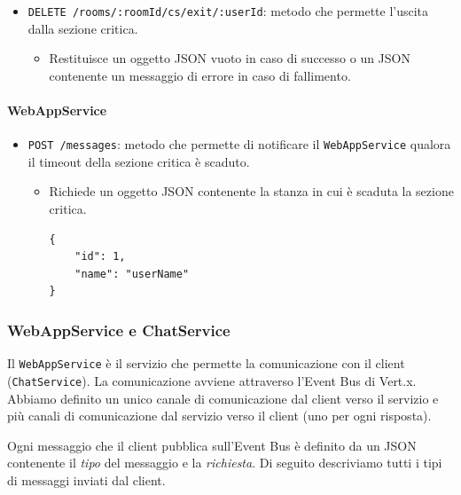 \documentclass[a4paper]{article}
\begin{document}
\begin{itemize}
\begin{itemize}
\begin{verbatim}
    "name": "userName"
}
        \end{verbatim}
        \item Restituisce un oggetto JSON vuoto in caso di successo o un JSON contenente un messaggio di errore in caso di fallimento.
    \end{itemize}
    \item \texttt{DELETE /rooms/:roomId/cs/exit/:userId}: metodo che permette l'uscita dalla sezione critica.
    \begin{itemize}
        \item Restituisce un oggetto JSON vuoto in caso di successo o un JSON contenente un messaggio di errore in caso di fallimento.
    \end{itemize}
\end{itemize}

\paragraph{WebAppService}
\begin{itemize}
    \item \texttt{POST /messages}: metodo che permette di notificare il \texttt{WebAppService} qualora il timeout della sezione critica è scaduto.
    \begin{itemize}
        \item Richiede un oggetto JSON contenente la stanza in cui è scaduta la sezione critica.
        \begin{verbatim}
{
    "id": 1,
    "name": "userName"
}
        \end{verbatim}
    \end{itemize}
\end{itemize}

\subsubsection{WebAppService e ChatService}
Il \texttt{WebAppService} è il servizio che permette la comunicazione con il client (\texttt{ChatService}).
La comunicazione avviene attraverso l'Event Bus di Vert.x.
Abbiamo definito un unico canale di comunicazione dal client verso il servizio e più canali di comunicazione dal servizio verso il client (uno per ogni risposta). 

Ogni messaggio che il client pubblica sull'Event Bus è definito da un JSON contenente il \textit{tipo} del messaggio e la \textit{richiesta}.
Di seguito descriviamo tutti i tipi di messaggi inviati dal client.
\end{document}
